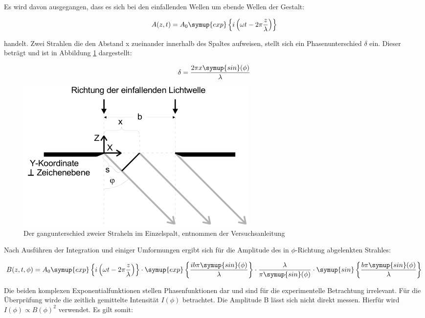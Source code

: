 Es wird davon ausgegangen, dass es sich bei den einfallenden Wellen um ebende Wellen der Gestalt:

\begin{equation}
  A(z,t) = A_0 \symup{exp}\left\{i \left(\omega t - 2\pi \frac{z}{\lambda} \right) \right\}
\end{equation}

handelt.
Zwei Strahlen die den Abstand x zueinander innerhalb des Spaltes aufweisen, stellt sich ein Phasenunterschied $\delta$ ein.
Dieser beträgt und ist in Abbildung \ref{fig:Phasenunterschied} dargestellt:

\begin{equation}
  \delta = \frac{2\pi x \symup{sin}(\phi)}{\lambda}
\end{equation}

\begin{figure}
  \centering
  \includegraphics[scale=0.7]{images/Phasenunterschied.png}
  \caption{Der gangunterschied zweier Straheln im Einzelspalt, entnommen der Versuchsanleitung \cite[32]{1}}
  \label{fig:Phasenunterschied}
\end{figure}

Nach Ausführen der Integration und einiger Umformungen ergibt sich für die Amplitude des in $\phi$-Richtung abgelenkten Strahles:

\begin{equation}
  B(z, t, \phi) = A_0 \symup{exp}\left\{i \left(\omega t - 2\pi \frac{z}{\lambda} \right) \right\}
  \cdot \symup{exp}\left\{ \frac{i b \pi \symup{sin}(\phi)}{\lambda} \right\}
  \cdot \frac{\lambda}{\pi \symup{sin}(\phi)}
  \cdot \symup{sin} \left\{ \frac{b \pi \symup{sin}(\phi)}{\lambda} \right\}
\end{equation}

Die beiden komplexen Exponentialfunktionen stellen Phasenfunktionen dar und sind für die experimentelle Betrachtung irrelevant.
Für die Überprüfung wirde die zeitlich gemittelte Intensität $I(\phi)$ betrachtet.
Die Amplitude B lässt sich nicht direkt messen.
Hierfür wird $I(\phi) \propto B(\phi)^2$ verwendet.
Es gilt somit:

